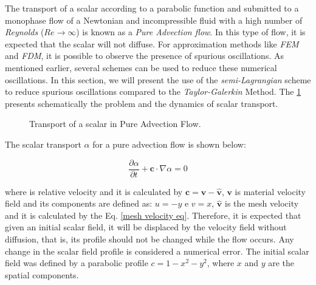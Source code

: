 The transport of a scalar according to a parabolic function and 
submitted to a monophase flow of a Newtonian and incompressible fluid 
with a high number of \textit{Reynolds} 
($\textit{Re} \rightarrow \infty$) is known as a 
\textit{Pure Advection flow}. In this type of flow, 
it is expected that the scalar will not diffuse. 
For approximation methods like \textit{FEM} and \textit{FDM}, 
it is possible to observe the presence of spurious oscillations. 
As mentioned earlier, several schemes can be used to reduce these 
numerical oscillations. In this section, we will present the use 
of the \textit{semi-Lagrangian} scheme to reduce spurious oscillations 
compared to the \textit{Taylor-Galerkin} Method. 
The \ref{conveccao} presents schematically the problem and 
the dynamics of scalar transport.

\vspace{0.5cm}
\begin{figure}[H]
\begin{center}
\end{center}
\caption{Transport of a scalar in Pure Advection Flow.}
\label{conveccao}
\end{figure}

\medskip
\noindent
The scalar transport $\alpha$ for a pure advection flow is shown below:


\begin{equation}
 \frac{\partial \alpha}{\partial t} 
 + 
 \textbf{c} \cdot \nabla \alpha
 = 0
\end{equation}

\noindent
where is relative velocity and it is calculated by 
$\textbf{c} = \textbf{v} - \hat{\textbf{v}}$,
$\textbf{v}$ is material velocity field and its components are
defined as: $u = -y$ e $v = x$,
$\hat{\textbf{v}}$ is the mesh velocity and it is calculated
by the Eq. \ref{mesh velocity eq}. 
Therefore, it is expected that given an initial scalar field, 
it will be displaced by the velocity field without diffusion, 
that is, its profile should not be changed while the flow occurs. 
Any change in the scalar field profile is considered a numerical error.
The initial scalar field was defined by a parabolic
profile $c = 1 - x^2 - y^2$, where $x$ and $y$ are the spatial components.



